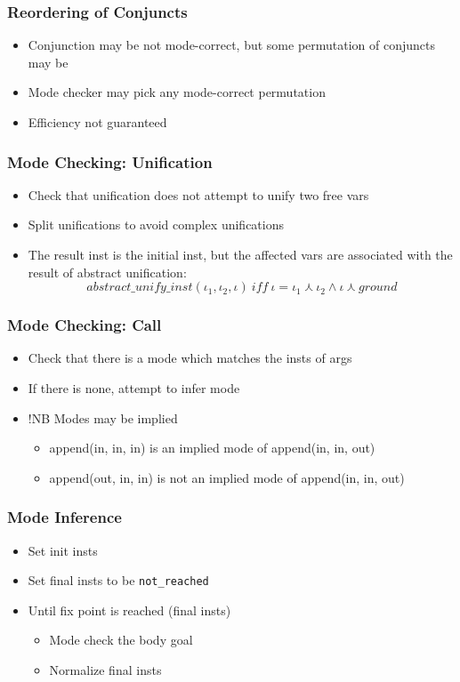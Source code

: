 \documentclass{beamer}
\newcommand{\cmark}{\ding{51}}%
\newcommand{\xmark}{\ding{55}}%
\begin{document}
\begin{frame}[fragile]
  \frametitle{Reordering of Conjuncts}
\begin{itemize}
  \item Conjunction may be not mode-correct, but some permutation of conjuncts may be
  \item Mode checker may pick any mode-correct permutation
  \item Efficiency not guaranteed
\end{itemize}
\end{frame}


\begin{frame}[fragile]
  \frametitle{Mode Checking: Unification}
  \begin{itemize}
    \item Check that unification does not attempt to unify two free vars
    \item Split unifications to avoid complex unifications
    \item The result inst is the initial inst, but the affected vars are associated with the result of abstract unification:
    $$
    abstract\_unify\_inst(\iota_1, \iota_2, \iota) \ iff \ \iota = \iota_1 \curlywedge \iota_2 \wedge \iota \curlywedge ground
    $$
  \end{itemize}
\end{frame}

\begin{frame}[fragile]
  \frametitle{Mode Checking: Call}
  \begin{itemize}
    \item Check that there is a mode which matches the insts of args
    \item If there is none, attempt to infer mode
    \item !NB Modes may be implied
    \begin{itemize}
      \item{\cmark} append(in, in, in) is an implied mode of append(in, in, out)
      \item{\xmark} append(out, in, in) is not an implied mode of append(in, in, out)
    \end{itemize}
  \end{itemize}
\end{frame}


\begin{frame}[fragile]
  \frametitle{Mode Inference}
\begin{itemize}
  \item Set init insts
  \item Set final insts to be \texttt{not\_reached}
  \item Until fix point is reached (final insts)
  \begin{itemize}
    \item Mode check the body goal
    \item Normalize final insts
  \end{itemize}
\end{itemize}
\end{frame}
\end{document}
